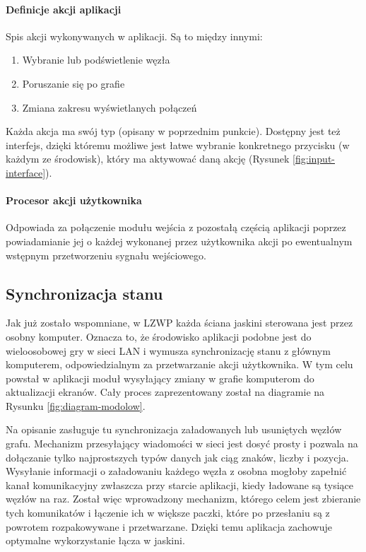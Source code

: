 \paragraph{Definicje akcji aplikacji}
Spis akcji wykonywanych w aplikacji. Są to między innymi: 
\begin{enumerate}[label=\textbullet]
	\item Wybranie lub podświetlenie węzła
	\item Poruszanie się po grafie
	\item Zmiana zakresu wyświetlanych połączeń
\end{enumerate}
Każda akcja ma swój typ (opisany w poprzednim punkcie). Dostępny jest też interfejs, dzięki któremu możliwe jest łatwe wybranie konkretnego przycisku (w każdym ze środowisk), który ma aktywować daną akcję (Rysunek \ref{fig:input-interface}).

\paragraph{Procesor akcji użytkownika}
Odpowiada za połączenie modułu wejścia z pozostałą częścią aplikacji poprzez powiadamianie jej o każdej wykonanej przez użytkownika akcji po ewentualnym wstępnym przetworzeniu sygnału wejściowego.



\subsection{Synchronizacja stanu}
Jak już zostało wspomniane, w LZWP każda ściana jaskini sterowana jest przez osobny komputer. Oznacza to, że środowisko aplikacji podobne jest do wieloosobowej gry w sieci LAN i wymusza synchronizację stanu z głównym komputerem, odpowiedzialnym za przetwarzanie akcji użytkownika. W tym celu powstał w aplikacji moduł wysyłający zmiany w grafie komputerom do aktualizacji ekranów. Cały proces zaprezentowany został na diagramie na Rysunku \ref{fig:diagram-modolow}.

Na opisanie zasługuje tu synchronizacja załadowanych lub usuniętych węzłów grafu. Mechanizm przesyłający wiadomości w sieci jest dosyć prosty i pozwala na dołączanie tylko najprostszych typów danych jak ciąg znaków, liczby i pozycja. Wysyłanie informacji o załadowaniu każdego węzła z osobna mogłoby zapełnić kanał komunikacyjny zwłaszcza przy starcie aplikacji, kiedy ładowane są tysiące węzłów na raz. Został więc wprowadzony mechanizm, którego celem jest zbieranie tych komunikatów i łączenie ich w większe paczki, które po przesłaniu są z powrotem rozpakowywane i przetwarzane. Dzięki temu aplikacja zachowuje optymalne wykorzystanie łącza w jaskini.

